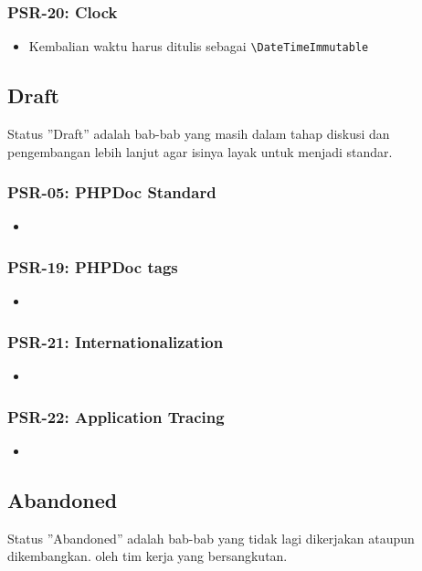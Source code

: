 \subsubsection{PSR-20: Clock}
\label{subsubsec:psr20}
\begin{itemize}
	\item Kembalian waktu harus ditulis sebagai \verb|\DateTimeImmutable|    
\end{itemize}

\subsection{Draft}
\label{subsec:draft}
Status ''Draft'' adalah bab-bab yang masih dalam tahap diskusi dan pengembangan lebih lanjut agar isinya layak untuk menjadi standar.

\subsubsection{PSR-05: PHPDoc Standard}
\label{subsubsec:psr05}
\begin{itemize}
	\item
\end{itemize}

\subsubsection{PSR-19: PHPDoc tags}
\label{subsubsec:psr19}
\begin{itemize}
	\item
\end{itemize}

\subsubsection{PSR-21: Internationalization}
\label{subsubsec:psr21}
\begin{itemize}
	\item
\end{itemize}

\subsubsection{PSR-22: Application Tracing}
\label{subsubsec:psr22}
\begin{itemize}
	\item
\end{itemize}


\subsection{Abandoned}
\label{subsec:abandoned}
Status ''Abandoned'' adalah bab-bab yang tidak lagi dikerjakan ataupun dikembangkan. oleh tim kerja yang bersangkutan. 


